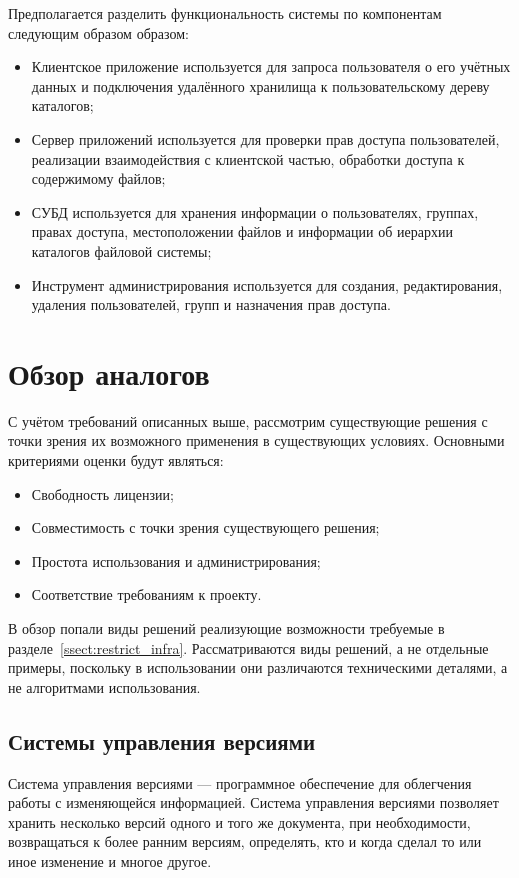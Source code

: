 \documentclass[utf8,usehyperref,12pt]{G7-32}
\begin{document}
Предполагается разделить функциональность системы по компонентам следующим образом образом:
\begin{itemize}
 \item Клиентское приложение используется для запроса пользователя о его учётных данных и подключения удалённого хранилища к пользовательскому дереву каталогов;
 \item Сервер приложений используется для проверки прав доступа пользователей, реализации взаимодействия с клиентской частью, обработки доступа к содержимому файлов;
 \item СУБД используется для хранения информации о пользователях, группах, правах доступа, местоположении файлов и информации об иерархии каталогов файловой системы;
 \item Инструмент администрирования используется для создания, редактирования, удаления пользователей, групп и назначения прав доступа.
\end{itemize}

\section{Обзор аналогов}\label{sect_analogs}
С учётом требований описанных выше, рассмотрим существующие решения с точки зрения их возможного применения в существующих условиях. Основными критериями оценки будут являться:
\begin{itemize}
 \item Свободность лицензии;
 \item Совместимость с точки зрения существующего решения;
 \item Простота использования и администрирования;
 \item Соответствие требованиям к проекту.
\end{itemize}

В обзор попали виды решений реализующие возможности требуемые в разделе~\ref{ssect:restrict_infra}. Рассматриваются виды решений, а не отдельные примеры, поскольку в использовании они различаются техническими деталями, а не алгоритмами использования.

\subsection{Системы управления версиями}
Система управления версиями — программное обеспечение для облегчения работы с изменяющейся информацией. Система управления версиями позволяет хранить несколько версий одного и того же документа, при необходимости, возвращаться к более ранним версиям, определять, кто и когда сделал то или иное изменение и многое другое.
\end{document}

